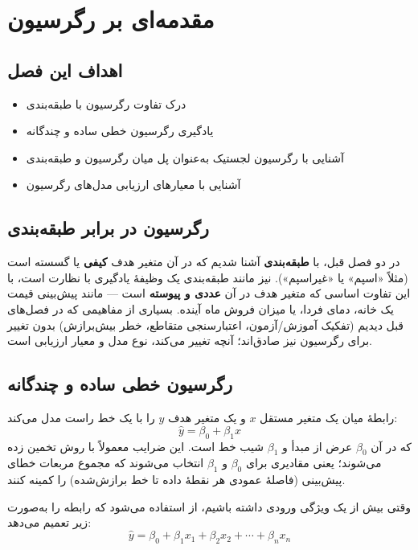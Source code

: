 \chapter{مقدمه‌ای بر رگرسیون}
\label{ch:regression}

\section*{اهداف این فصل}
\begin{itemize}
    \item درک تفاوت رگرسیون با طبقه‌بندی
    \item یادگیری رگرسیون خطی ساده و چندگانه
    \item آشنایی با رگرسیون لجستیک به‌عنوان پل میان رگرسیون و طبقه‌بندی
    \item آشنایی با معیارهای ارزیابی مدل‌های رگرسیون
\end{itemize}

\section{رگرسیون در برابر طبقه‌بندی}

در دو فصل قبل، با \textbf{طبقه‌بندی} آشنا شدیم که در آن متغیر هدف
\textbf{کیفی} یا گسسته است (مثلاً «اسپم» یا «غیراسپم»).
 نیز مانند طبقه‌بندی یک وظیفهٔ
یادگیری با نظارت است، با این تفاوت اساسی که متغیر هدف در آن
\textbf{عددی و پیوسته} است — مانند پیش‌بینی قیمت یک خانه، دمای فردا، یا
میزان فروش ماه آینده. بسیاری از مفاهیمی که در فصل‌های قبل دیدیم (تفکیک
آموزش/آزمون، اعتبارسنجی متقاطع، خطر بیش‌برازش) بدون تغییر برای رگرسیون
نیز صادق‌اند؛ آنچه تغییر می‌کند، نوع مدل و معیار ارزیابی است.

\section{رگرسیون خطی ساده و چندگانه}

 رابطهٔ میان
یک متغیر مستقل $x$ و یک متغیر هدف $y$ را با یک خط راست مدل می‌کند:
\[
\hat{y} = \beta_0 + \beta_1 x
\]
که در آن $\beta_0$ عرض از مبدأ و $\beta_1$ شیب خط است. این ضرایب معمولاً
با روش 
تخمین زده می‌شوند؛ یعنی مقادیری برای $\beta_0$ و $\beta_1$ انتخاب
می‌شوند که مجموع مربعات خطای پیش‌بینی (فاصلهٔ عمودی هر نقطهٔ داده تا خط
برازش‌شده) را کمینه کنند.

وقتی بیش از یک ویژگی ورودی داشته باشیم، از
استفاده می‌شود که رابطه را به‌صورت زیر تعمیم می‌دهد:
\[
\hat{y} = \beta_0 + \beta_1 x_1 + \beta_2 x_2 + \cdots + \beta_n x_n
\]

